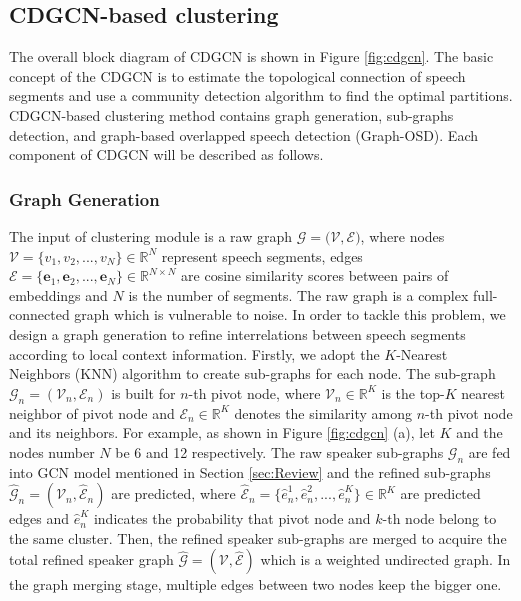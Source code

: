 \documentclass[10pt]{article}
\begin{document}
\subsection{CDGCN-based clustering}
The overall block diagram of CDGCN is shown in Figure \ref{fig:cdgcn}. The basic concept of the CDGCN is to estimate the topological connection of speech segments and use a community detection algorithm to find the optimal partitions. CDGCN-based clustering method contains graph generation, sub-graphs detection, and graph-based overlapped speech detection (Graph-OSD). Each component of CDGCN will be described as follows.

\subsubsection{Graph Generation}
The input of clustering module is a raw graph ${\mathcal{G}}=(\mathcal{V},\boldsymbol{\mathcal{E})}$, where nodes $\mathcal{V}=\{{v}_{1}, {v}_{2},...,{v}_{N}\} \in \mathbb{R}^{N}$ represent speech segments, edges $\boldsymbol{\mathcal{E}} = \{\boldsymbol{e}_{1},\boldsymbol{e}_{2},...,\boldsymbol{e}_{N}\} \in \mathbb{R}^{N \times N}$ are cosine similarity scores between pairs of embeddings and $N$ is the number of segments. The raw graph is a complex full-connected graph which is vulnerable to noise. In order to tackle this problem, we design a graph generation to refine interrelations between speech segments according to local context information. Firstly, we adopt the $K$-Nearest Neighbors (KNN) algorithm to create sub-graphs for each node. The sub-graph $\mathcal{G}_{n}=(\mathcal{V}_{n},\mathcal{E}_{n})$ is built for $n$-th pivot node, where $\mathcal{V}_{n} \in \mathbb{R}^{K}$ is the top-$K$ nearest neighbor of pivot node and $\mathcal{E}_{n} \in \mathbb{R}^{K}$ denotes the similarity among $n$-th pivot node and its neighbors. For example, as shown in Figure \ref{fig:cdgcn} (a), let $K$ and the nodes number $N$ be 6 and 12 respectively. The raw speaker sub-graphs $\mathcal{G}_{n}$ are fed into GCN model mentioned in Section \ref{sec:Review} and the refined sub-graphs $\mathcal{\hat{G}}_{n}=(\mathcal{V}_{n},\mathcal{\hat{E}}_{n})$ are predicted, where $\mathcal{\hat{E}}_{n}=\{\hat{e}_{n}^{1},\hat{e}_{n}^{2},...,\hat{e}_{n}^{K}\}\in \mathbb{R}^{K}$ are predicted edges and $\hat{e}_{n}^{K}$ indicates the probability that pivot node and $k$-th node belong to the same cluster. Then, the refined speaker sub-graphs are merged to acquire the total refined 
speaker graph $\mathcal{\hat{G}}=(\mathcal{V},\mathcal{\hat{E}})$ which is a weighted undirected graph. In the graph merging stage, multiple edges between two nodes keep the bigger one.
\end{document}
